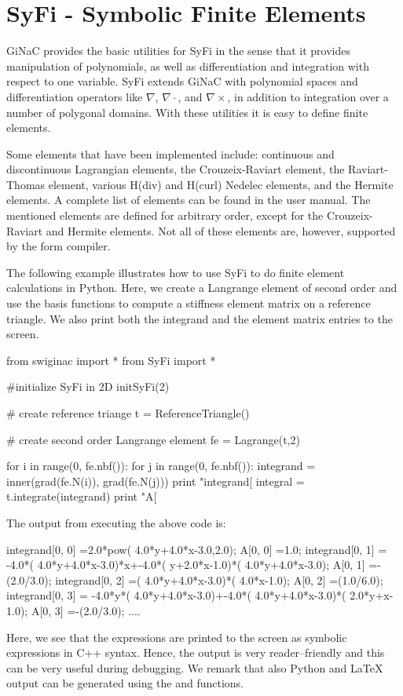 \section{SyFi - Symbolic Finite Elements}

GiNaC provides the basic utilities for SyFi in the sense
that it provides manipulation of polynomials, as well as differentiation and integration  
with respect to one variable. SyFi extends GiNaC with polynomial spaces and 
differentiation operators like $\nabla$, $\nabla\cdot$, and $\nabla\times$, 
in addition to integration over a number of polygonal domains. 
With these utilities it is easy to define finite elements. 

Some elements that have been implemented include:
continuous and discontinuous Lagrangian elements, 
the Crouzeix-Raviart element, the Raviart-Thomas element, various H(div) and H(curl) Nedelec 
elements, and the Hermite elements. A complete list of elements can be found
in the user manual. The mentioned elements are defined for arbitrary order, except for
the Crouzeix-Raviart and Hermite elements. Not all of these elements are, however, 
supported by the form compiler. 

The following example illustrates how to use SyFi to do finite element calculations in Python. 
Here, we create a Langrange element of second order and use the basis functions to compute a 
stiffness element matrix on a reference triangle. We also print both the integrand and 
the element matrix entries to the screen. 
\begin{code}
from swiginac import *
from SyFi import * 

#initialize SyFi in 2D
initSyFi(2)

# create reference triange 
t = ReferenceTriangle() 

# create second order Langrange element
fe = Lagrange(t,2)

for i in range(0, fe.nbf()):
    for j in range(0, fe.nbf()):
	integrand = inner(grad(fe.N(i)), grad(fe.N(j)))
	print "integrand[%
	integral = t.integrate(integrand) 
	print "A[%
\end{code}
The output from executing the above code is: 
\begin{code}
integrand[0, 0]  =2.0*pow( 4.0*y+4.0*x-3.0,2.0);
A[0, 0]          =1.0;
integrand[0, 1]  = -4.0*( 4.0*y+4.0*x-3.0)*x+-4.0*( y+2.0*x-1.0)*( 4.0*y+4.0*x-3.0);
A[0, 1]          =-(2.0/3.0);
integrand[0, 2]  =( 4.0*y+4.0*x-3.0)*( 4.0*x-1.0);
A[0, 2]          =(1.0/6.0);
integrand[0, 3]  = -4.0*y*( 4.0*y+4.0*x-3.0)+-4.0*( 4.0*y+4.0*x-3.0)*( 2.0*y+x-1.0);
A[0, 3]          =-(2.0/3.0);
....
\end{code}
Here, we see that the expressions are printed to the screen as symbolic expressions
in C++ syntax. Hence, the output is very reader--friendly and this can be very useful during debugging.  
We remark that also Python and LaTeX output can be generated using the  and  functions. 

